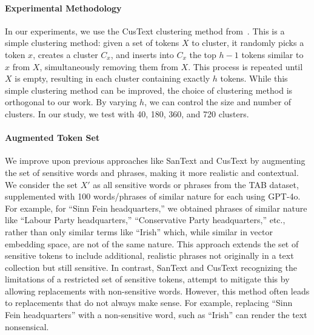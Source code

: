 \documentclass[11pt]{article}
\begin{document}
\paragraph{Experimental Methodology}
In our experiments, we use the CusText clustering method from~\cite{chen2023customized}. This is a simple clustering method: given a set of tokens \(X\) to cluster, it randomly picks a token \(x\), creates a cluster \(C_x\), and inserts into \(C_x\) the top \(h-1\) tokens similar to \(x\) from \(X\), simultaneously removing them from \(X\). This process is repeated until \(X\) is empty, resulting in each cluster containing exactly \(h\) tokens. While this simple clustering method can be improved, the choice of clustering method is orthogonal to our work. By varying \(h\), we can control the size and number of clusters. In our study, we test with 40, 180, 360, and 720 clusters.

\paragraph{Augmented Token Set} We  improve upon previous approaches like SanText and CusText by augmenting the set of sensitive words and phrases, making it more realistic and contextual. We consider the set $X'$ as all sensitive words or phrases from the TAB dataset, supplemented with 100 words/phrases of similar nature for each using GPT-4o. For example, for ``Sinn Fein headquarters,'' we obtained phrases of similar nature like ``Labour Party headquarters,'' ``Conservative Party headquarters,'' etc., rather than only similar terms like ``Irish'' which, while similar in vector embedding space, are not of the same nature. This approach extends the set of sensitive tokens to include additional, realistic phrases not originally in a text collection but still sensitive.
In contrast, SanText and CusText recognizing the limitations of a restricted set of sensitive tokens, attempt to mitigate this by allowing replacements with non-sensitive words. 
However, this method often leads to replacements that do not always make sense. 
For example, replacing ``Sinn Fein headquarters'' with a non-sensitive word, such as ``Irish'' 
can render the text nonsensical. 
\end{document}
